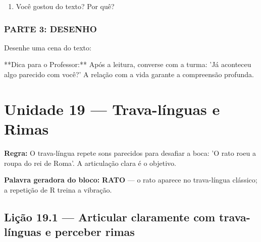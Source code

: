 \begin{exercicio}
\begin{enumerate}
  \item Você gostou do texto? Por quê?
  \begin{center}
  \underline{\hspace{12cm}}
  \end{center}

\end{enumerate}

\subsection*{PARTE 3: DESENHO}

Desenhe uma cena do texto:

\begin{center}
\end{center}

\end{exercicio}

\begin{dica}
**Dica para o Professor:** Após a leitura, converse com a turma: 'Já aconteceu algo parecido com você?' A relação com a vida garante a compreensão profunda.
\end{dica}


\chapter{Unidade 19 --- Trava-línguas e Rimas}


\textbf{Regra:} O trava-língua repete sons parecidos para desafiar a boca: 'O rato roeu a roupa do rei de Roma'. A articulação clara é o objetivo.

\textbf{Palavra geradora do bloco:} \textbf{RATO} --- o rato aparece no trava-língua clássico; a repetição de R treina a vibração.

\section{Lição 19.1 --- Articular claramente com trava-línguas e perceber rimas}

